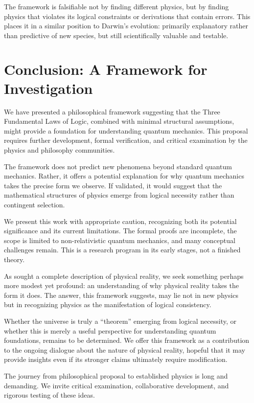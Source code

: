 \documentclass[12pt,a4paper]{article}
\begin{document}
The framework is falsifiable not by finding different physics, but by finding physics that violates its logical constraints or derivations that contain errors. This places it in a similar position to Darwin's evolution: primarily explanatory rather than predictive of new species, but still scientifically valuable and testable.

\section{Conclusion: A Framework for Investigation}

We have presented a philosophical framework suggesting that the Three Fundamental Laws of Logic, combined with minimal structural assumptions, might provide a foundation for understanding quantum mechanics. This proposal requires further development, formal verification, and critical examination by the physics and philosophy communities.

The framework does not predict new phenomena beyond standard quantum mechanics. Rather, it offers a potential explanation for why quantum mechanics takes the precise form we observe. If validated, it would suggest that the mathematical structures of physics emerge from logical necessity rather than contingent selection.

We present this work with appropriate caution, recognizing both its potential significance and its current limitations. The formal proofs are incomplete, the scope is limited to non-relativistic quantum mechanics, and many conceptual challenges remain. This is a research program in its early stages, not a finished theory.

As \citet{einstein1935can} sought a complete description of physical reality, we seek something perhaps more modest yet profound: an understanding of why physical reality takes the form it does. The answer, this framework suggests, may lie not in new physics but in recognizing physics as the manifestation of logical consistency.

Whether the universe is truly a ``theorem'' emerging from logical necessity, or whether this is merely a useful perspective for understanding quantum foundations, remains to be determined. We offer this framework as a contribution to the ongoing dialogue about the nature of physical reality, hopeful that it may provide insights even if its stronger claims ultimately require modification.

The journey from philosophical proposal to established physics is long and demanding. We invite critical examination, collaborative development, and rigorous testing of these ideas.
\end{document}
